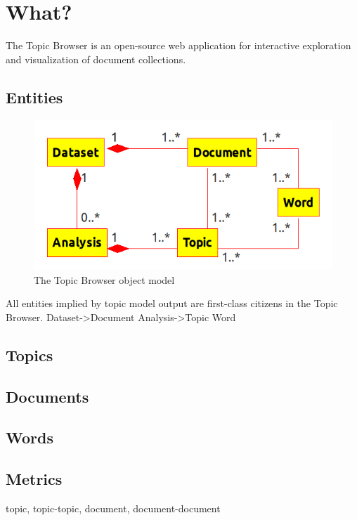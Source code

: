 \documentclass[a4paper,10pt]{article}
\begin{document}
\section{What?}
The Topic Browser is an open-source web application for interactive exploration and visualization of document collections. 

\subsection{Entities}
\begin{figure}[ht]
 \centering
 \includegraphics{topic_browser_object_model_transparent.png}
 \caption{The Topic Browser object model}
 \label{fig:object_model}
\end{figure}



All entities implied by topic model output are first-class citizens in the Topic Browser. 
Dataset->Document
Analysis->Topic
Word

\subsection{Topics}

\subsection{Documents}

\subsection{Words}

\subsection{Metrics}
topic, topic-topic, document, document-document
\end{document}
